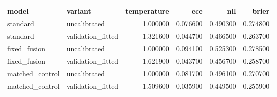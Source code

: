 \begin{tabular}{llrrrr}
\toprule
model & variant & temperature & ece & nll & brier \\
\midrule
standard & uncalibrated & 1.000000 & 0.076600 & 0.490300 & 0.274800 \\
standard & validation\_fitted & 1.321600 & 0.044700 & 0.466500 & 0.263700 \\
fixed\_fusion & uncalibrated & 1.000000 & 0.094100 & 0.525300 & 0.278500 \\
fixed\_fusion & validation\_fitted & 1.621900 & 0.043700 & 0.456700 & 0.258700 \\
matched\_control & uncalibrated & 1.000000 & 0.081700 & 0.496100 & 0.270700 \\
matched\_control & validation\_fitted & 1.509600 & 0.035900 & 0.449500 & 0.255900 \\
\bottomrule
\end{tabular}
